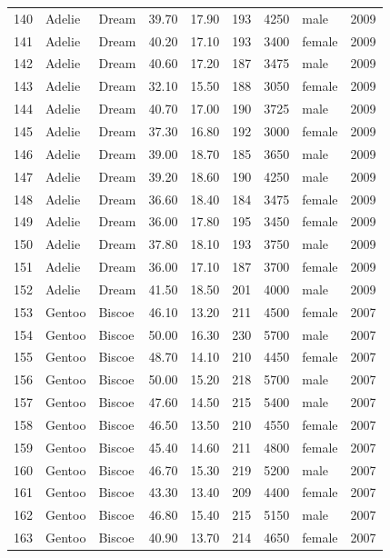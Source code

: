 \documentclass{article}\usepackage[]{graphicx}\usepackage[]{xcolor}
\begin{document}
\begin{table}[ht]
\begin{tabular}{rllrrrrlr}
  140 & Adelie & Dream & 39.70 & 17.90 & 193 & 4250 & male & 2009 \\ 
  141 & Adelie & Dream & 40.20 & 17.10 & 193 & 3400 & female & 2009 \\ 
  142 & Adelie & Dream & 40.60 & 17.20 & 187 & 3475 & male & 2009 \\ 
  143 & Adelie & Dream & 32.10 & 15.50 & 188 & 3050 & female & 2009 \\ 
  144 & Adelie & Dream & 40.70 & 17.00 & 190 & 3725 & male & 2009 \\ 
  145 & Adelie & Dream & 37.30 & 16.80 & 192 & 3000 & female & 2009 \\ 
  146 & Adelie & Dream & 39.00 & 18.70 & 185 & 3650 & male & 2009 \\ 
  147 & Adelie & Dream & 39.20 & 18.60 & 190 & 4250 & male & 2009 \\ 
  148 & Adelie & Dream & 36.60 & 18.40 & 184 & 3475 & female & 2009 \\ 
  149 & Adelie & Dream & 36.00 & 17.80 & 195 & 3450 & female & 2009 \\ 
  150 & Adelie & Dream & 37.80 & 18.10 & 193 & 3750 & male & 2009 \\ 
  151 & Adelie & Dream & 36.00 & 17.10 & 187 & 3700 & female & 2009 \\ 
  152 & Adelie & Dream & 41.50 & 18.50 & 201 & 4000 & male & 2009 \\ 
  153 & Gentoo & Biscoe & 46.10 & 13.20 & 211 & 4500 & female & 2007 \\ 
  154 & Gentoo & Biscoe & 50.00 & 16.30 & 230 & 5700 & male & 2007 \\ 
  155 & Gentoo & Biscoe & 48.70 & 14.10 & 210 & 4450 & female & 2007 \\ 
  156 & Gentoo & Biscoe & 50.00 & 15.20 & 218 & 5700 & male & 2007 \\ 
  157 & Gentoo & Biscoe & 47.60 & 14.50 & 215 & 5400 & male & 2007 \\ 
  158 & Gentoo & Biscoe & 46.50 & 13.50 & 210 & 4550 & female & 2007 \\ 
  159 & Gentoo & Biscoe & 45.40 & 14.60 & 211 & 4800 & female & 2007 \\ 
  160 & Gentoo & Biscoe & 46.70 & 15.30 & 219 & 5200 & male & 2007 \\ 
  161 & Gentoo & Biscoe & 43.30 & 13.40 & 209 & 4400 & female & 2007 \\ 
  162 & Gentoo & Biscoe & 46.80 & 15.40 & 215 & 5150 & male & 2007 \\ 
  163 & Gentoo & Biscoe & 40.90 & 13.70 & 214 & 4650 & female & 2007 \\ 

\end{tabular}
\end{table}
\end{document}
